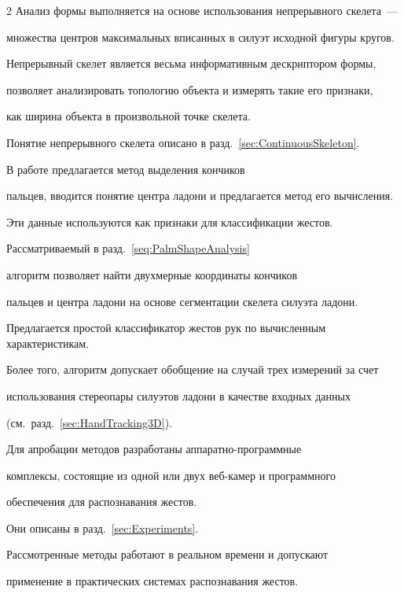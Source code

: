 \begin{multicols}{2}
Анализ формы выполняется на основе использования непрерывного скелета~---  


множества центров максимальных вписанных в силуэт исходной фигуры кругов.


Непрерывный скелет является весьма информативным дескриптором формы,


позволяет анализировать топологию объекта и измерять такие его признаки, 


как ширина объекта в произвольной точке скелета.


Понятие непрерывного скелета описано в разд.~\ref{sec:ContinuousSkeleton}.





В работе предлагается метод выделения кончиков 


пальцев, вводится понятие центра ладони и предлагается метод его вычисления.


Эти данные используются как признаки для классификации жес\-тов.


Рассматриваемый в разд.~\ref{seq:PalmShapeAnalysis} 


алгоритм позволяет найти двухмерные координаты кончиков 


пальцев и центра ладони на основе сегментации скелета силуэта ладони.


Предлагается простой классификатор жестов рук по вычисленным характеристикам.


Более того, алгоритм допускает обобщение на случай трех измерений за счет 


использования стереопары силуэтов ладони в качестве входных данных


(см.\ разд.~\ref{sec:HandTracking3D}).





Для апробации методов разработаны ап\-па\-рат\-но-про\-грам\-мные 


комплексы, состоящие из одной или двух веб-ка\-мер и программного 


обеспечения для распознавания жестов.


Они описаны в разд.~\ref{sec:Experiments}.





Рассмотренные методы работают в реальном времени и допускают 


применение в практических системах распознавания жестов.






\end{multicols}

